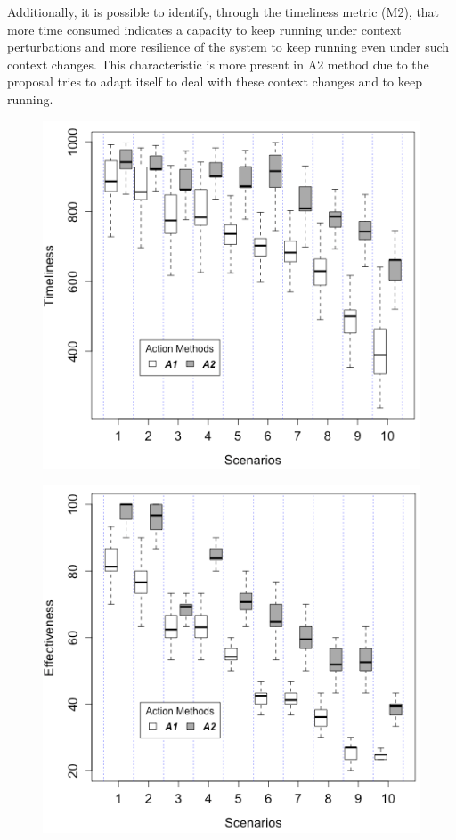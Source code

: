 Additionally, it is possible to identify, through the timeliness metric (M2), that more time consumed indicates a capacity to keep running under context perturbations and more resilience of the system to keep running even under such context changes. This characteristic is more present in A2 method due to the proposal tries to adapt itself to deal with these context changes and to keep running. 

\begin{figure}
\centering
\begin{minipage}{.5\textwidth}
  \centering
  \includegraphics[width=0.95\linewidth]{figures/graphs/Boxplot_M3.png}
  \label{fig:m2}
\end{minipage}%
\begin{minipage}{.5\textwidth}
  \centering
  \includegraphics[width=0.95\linewidth]{figures/graphs/Boxplot_M5.png}
  \label{fig:m3}
\end{minipage}
\end{figure}


